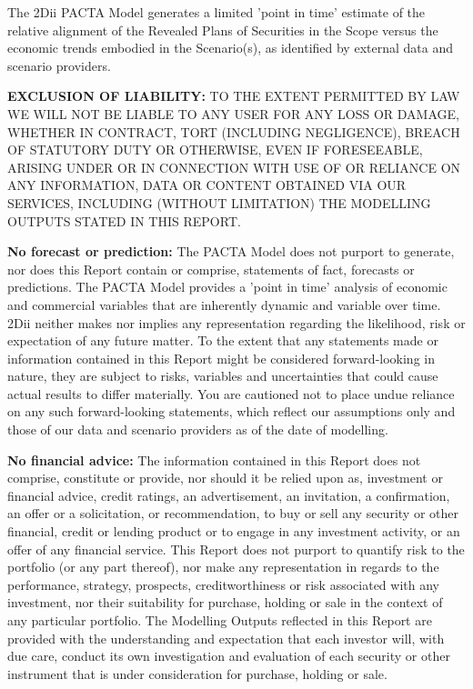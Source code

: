 \documentclass[10pt,table]{article}\usepackage[]{graphicx}\usepackage[]{color}
\begin{document}
	The 2Dii PACTA Model generates a limited 'point in time' estimate of the relative alignment of the Revealed Plans of Securities in the Scope versus the economic trends embodied in the Scenario(s), as identified by external data and scenario providers. 

	\textbf{EXCLUSION OF LIABILITY: }TO THE EXTENT PERMITTED BY LAW WE WILL NOT BE LIABLE TO ANY USER FOR ANY LOSS OR DAMAGE, WHETHER IN CONTRACT, TORT (INCLUDING NEGLIGENCE), BREACH OF STATUTORY DUTY OR OTHERWISE, EVEN IF FORESEEABLE, ARISING UNDER OR IN CONNECTION WITH USE OF OR RELIANCE ON ANY INFORMATION, DATA OR CONTENT OBTAINED VIA OUR SERVICES, INCLUDING (WITHOUT LIMITATION) THE MODELLING OUTPUTS STATED IN THIS REPORT.

	\textbf{No forecast or prediction: }The PACTA Model does not purport to generate, nor does this Report contain or comprise, statements of fact, forecasts or predictions. The PACTA Model provides a 'point in time' analysis of economic and commercial variables that are inherently dynamic and variable over time. 2Dii neither makes nor implies any representation regarding the likelihood, risk or expectation of any future matter. To the extent that any statements made or information contained in this Report might be considered forward-looking in nature, they are subject to risks, variables and uncertainties that could cause actual results to differ materially. You are cautioned not to place undue reliance on any such forward-looking statements, which reflect our assumptions only and those of our data and scenario providers as of the date of modelling.

	\textbf{No financial advice: }The information contained in this Report does not comprise, constitute or provide, nor should it be relied upon as, investment or financial advice, credit ratings, an advertisement, an invitation, a confirmation, an offer or a solicitation, or recommendation, to buy or sell any security or other financial, credit or lending product or to engage in any investment activity, or an offer of any financial service. This Report does not purport to quantify risk to the portfolio (or any part thereof), nor make any representation in regards to the performance, strategy, prospects, creditworthiness or risk associated with any investment, nor their suitability for purchase, holding or sale in the context of any particular portfolio. The Modelling Outputs reflected in this Report are provided with the understanding and expectation that each investor will, with due care, conduct its own investigation and evaluation of each security or other instrument that is under consideration for purchase, holding or sale. 
\end{document}
